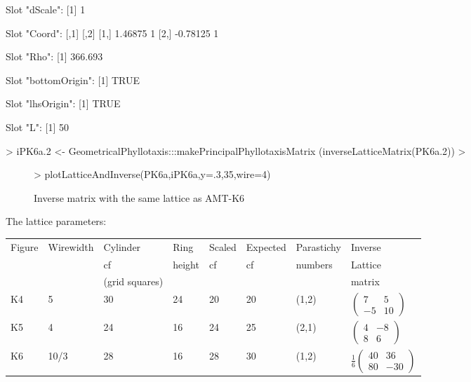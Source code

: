 \documentclass[a4paper]{article}
\begin{document}
\begin{Schunk}
\begin{Soutput}
Slot "dScale":
[1] 1

Slot "Coord":
         [,1] [,2]
[1,]  1.46875    1
[2,] -0.78125    1

Slot "Rho":
[1] 366.693

Slot "bottomOrigin":
[1] TRUE

Slot "lhsOrigin":
[1] TRUE

Slot "L":
[1] 50
\end{Soutput}
\begin{Sinput}
> iPK6a.2 <-  GeometricalPhyllotaxis:::makePrincipalPhyllotaxisMatrix (inverseLatticeMatrix(PK6a.2))
> 
\end{Sinput}
\end{Schunk}
\begin{figure}\begin{center}
\begin{Schunk}
\begin{Sinput}
> plotLatticeAndInverse(PK6a,iPK6a,y=.3,35,wire=4)
\end{Sinput}
\end{Schunk}
\caption{Inverse matrix with the same lattice as AMT-K6}
\end{center}
\end{figure}

The lattice parameters:
\begin{center}
\begin{tabular}{llllllll}
Figure 	& Wirewidth &  Cylinder 			& Ring  & Scaled  &Expected  	& Parastichy  & Inverse
\\
 				&  					&  cf &  height &  cf & cf 	&  numbers &  Lattice
\\
 				& 	 				&  (grid squares) &  	 &  	 & 	&   &  matrix
\\
K4  & 5   &30 & 24 & 20 & 20 & (1,2) & $ \left( \begin{array}{ll}	7 & 5 \\ -5  & 10 \end{array} \right) $
\\
K5 & 4  & 24 & 16 & 24 & 25 & (2,1) & $ \left( \begin{array}{ll}	4 & -8 \\ 8  & 6  \end{array}  \right)$
\\
K6 & 10/3  &  28 & 16 & 28 & 30 & (1,2) & $ \frac{1}{6}\left( \begin{array}{ll}	40 & 36 \\ 80  & -30  \end{array} \right)$
\end{tabular}
\end{center}
\end{document}
